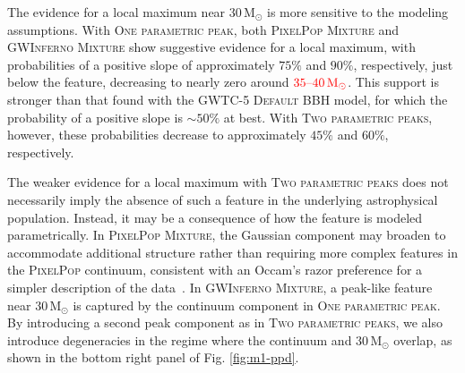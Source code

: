 \documentclass[twocolumn,twocolappendix,linenumbers]{aastex631}
\newcommand{\PixelPop}{\textsc{PixelPop}\xspace}
\newcommand{\PPMixture}{\textsc{PixelPop Mixture}\xspace}
\newcommand{\GwinfMixture}{\textsc{GWInferno Mixture}\xspace}
\newcommand{\oneparpeak}{\textsc{One parametric peak}\xspace}
\newcommand{\twoparpeaks}{\textsc{Two parametric peaks}\xspace}
\newcommand{\Msun}{\ensuremath{\mathrm{M}_\odot}\xspace}
\begin{document}

The evidence for a local maximum near $30\,\Msun$ is more sensitive to the modeling assumptions. With \oneparpeak, both \PPMixture and \GwinfMixture show suggestive evidence for a local maximum, with probabilities of a positive slope of approximately $75\%$ and $90\%$, respectively, just below the feature, decreasing to nearly zero around $\textcolor{red}{35\text{--}40\,\Msun}$. This support is stronger than that found with the \ac{GWTC-5} \textsc{Default} \ac{BBH} model, for which the probability of a positive slope is $\sim50\%$ at best. With \twoparpeaks, however, these probabilities decrease to approximately $45\%$ and $60\%$, respectively.

The weaker evidence for a local maximum with \twoparpeaks does not necessarily imply the absence of such a feature in the underlying astrophysical population.
Instead, it may be a consequence of how the feature is modeled parametrically.
In \PPMixture, the Gaussian component may broaden to accommodate additional structure rather than requiring more complex features in the \PixelPop continuum, consistent with an Occam's razor preference for a simpler description of the data~\citep{Alvarez-Lopez:inprep}.
In \GwinfMixture, a peak-like feature near \(30\,\Msun\) is captured by the continuum component in \oneparpeak.
By introducing a second peak component as in \twoparpeaks, we also introduce degeneracies in the regime where the continuum and \(30\,\Msun\) overlap, as shown in the bottom right panel of Fig. \ref{fig:m1-ppd}.
\end{document}
